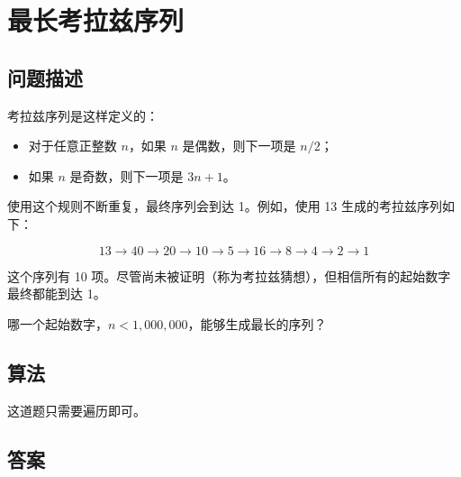 \section{最长考拉兹序列}
\subsection{问题描述}
\begin{tcolorbox}
考拉兹序列是这样定义的：

\begin{itemize}
    \item 对于任意正整数 $n$，如果 $n$ 是偶数，则下一项是 $n / 2$；
    \item 如果 $n$ 是奇数，则下一项是 $3n + 1$。
\end{itemize}

使用这个规则不断重复，最终序列会到达 1。例如，使用 13 生成的考拉兹序列如下：

\[
13 \to 40 \to 20 \to 10 \to 5 \to 16 \to 8 \to 4 \to 2 \to 1
\]

这个序列有 10 项。尽管尚未被证明（称为考拉兹猜想），但相信所有的起始数字最终都能到达 1。

哪一个起始数字，$n < 1,000,000$，能够生成最长的序列？
\end{tcolorbox}

\subsection{算法}
这道题只需要遍历即可。

\subsection{答案}
